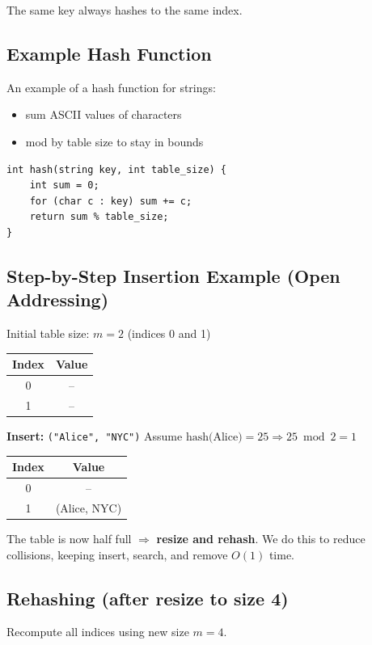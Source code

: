 \documentclass{article}
\begin{document}
The same key always hashes to the same index.

\subsection{Example Hash Function}
An example of a hash function for strings:
\begin{itemize}
  \item sum ASCII values of characters
  \item mod by table size to stay in bounds
\end{itemize}

\begin{verbatim}
int hash(string key, int table_size) {
    int sum = 0;
    for (char c : key) sum += c;
    return sum % table_size;
}
\end{verbatim}

\subsection{Step-by-Step Insertion Example (Open Addressing)}

Initial table size: $m = 2$ (indices 0 and 1)

\begin{center}
\begin{tabular}{c c}
\toprule
Index & Value \\
\midrule
0 & -- \\
1 & -- \\
\bottomrule
\end{tabular}
\end{center}

\textbf{Insert:} \texttt{("Alice", "NYC")}  
Assume $\text{hash(Alice)} = 25 \Rightarrow 25 \bmod 2 = 1$

\begin{center}
\begin{tabular}{c c}
\toprule
Index & Value \\
\midrule
0 & -- \\
1 & (Alice, NYC) \\
\bottomrule
\end{tabular}
\end{center}

The table is now half full $\Rightarrow$ \textbf{resize and rehash}. We do this to reduce collisions, keeping insert, search, and remove $O(1)$ time.

\subsection{Rehashing (after resize to size 4)}
Recompute all indices using new size $m = 4$.
\end{document}
